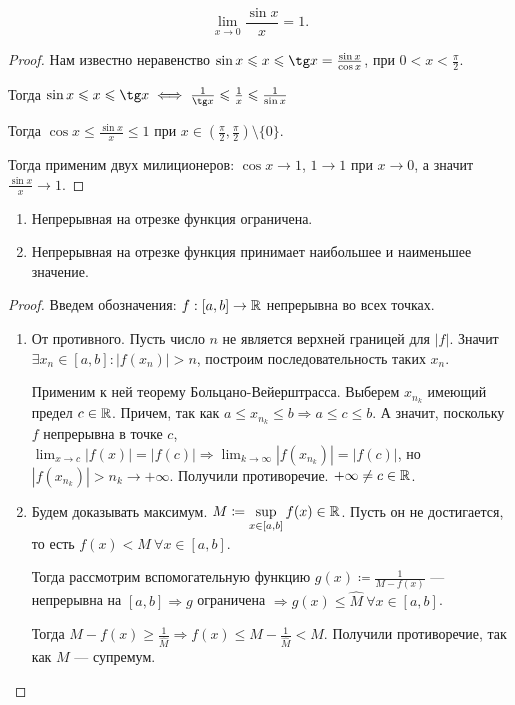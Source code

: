 \begin{theorem}
    \[
        \lim_{x\to 0} \frac{\sin x}{x} = 1
    .\] 
\end{theorem}
\begin{proof}
    Нам известно неравенство $\sin x \le x \le \tg x = \frac{\sin x}{\cos x}$, при $0 < x < \frac{\pi}{2}$. 

    Тогда $\sin x \le x \le \tg x \iff \frac{1}{\tg x} \le \frac{1}{x} \le \frac{1}{\sin x}$

    Тогда $\cos x \le \frac{\sin x}{x} \le 1$ при $x \in \left(\frac{\pi}{2}, \frac{\pi}{2}\right) \setminus \{0\}$.

    Тогда применим двух милиционеров: $\cos x \to 1$,  $1 \to 1$ при $x\to 0$, а значит  $\frac{\sin x}{x} \to 1$.
\end{proof}
\begin{theorem}
\slashn
\begin{enumerate}
    \item Непрерывная на отрезке функция ограничена.
    \item Непрерывная на отрезке функция принимает наибольшее и наименьшее значение.
\end{enumerate}
\end{theorem}
\begin{proof}
    Введем обозначения: $f: [a, b] \to \mathbb{R}$ непрерывна во всех точках.
    \begin{enumerate}
        \item От противного. Пусть число $n$ не является верхней границей для  $|f|$. Значит  $\exists x_n \in [a, b]\!: |f(x_n)| > n$, построим последовательность таких $x_n$.  

            Применим к ней теорему Больцано-Вейерштрасса. Выберем $x_{n_k}$ имеющий предел  $c \in \mathbb{R}$. Причем, так как  $a \le x_{n_k} \le b \Rightarrow a \le c \le b$. А значит, поскольку $f$ непрерывна в точке $c$, $\displaystyle \lim_{x\to c}|f(x)| = |f(c)| \Rightarrow \lim_{k \to \infty} |f(x_{n_k})| = |f(c)|$, но $|f(x_{n_k})| > n_k \to +\infty$. Получили противоречие.  $+\infty \neq c \in \mathbb{R}$.
        \item Будем доказывать максимум.  $\displaystyle M \coloneqq \sup_{x \in [a ,b]} f(x) \in \mathbb{R}$. Пусть он не достигается, то есть $f(x) < M\ \forall x \in [a, b]$. 

            Тогда рассмотрим вспомогательную функцию $g(x) \coloneqq \frac{1}{M - f(x)}$ --- непрерывна на $[a, b] \Rightarrow g$ ограничена  $\Rightarrow g(x) \le \widehat{M}\ \forall x \in [a, b]$.

            Тогда $M - f(x) \ge \frac{1}{\widehat{M}} \Rightarrow f(x) \le M - \frac{1}{\widehat{M}} < M$. Получили противоречие, так как $M$ --- супремум.
    \end{enumerate}
\end{proof}
